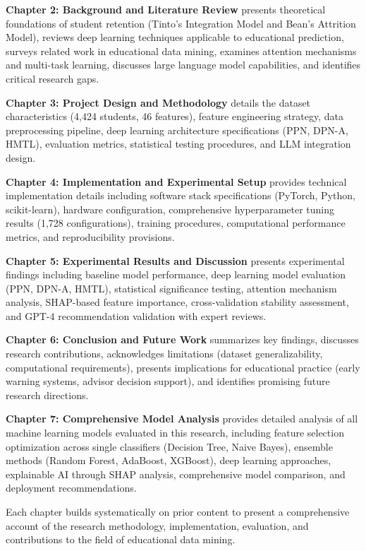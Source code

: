 \textbf{Chapter 2: Background and Literature Review} presents theoretical foundations of student retention (Tinto's Integration Model and Bean's Attrition Model), reviews deep learning techniques applicable to educational prediction, surveys related work in educational data mining, examines attention mechanisms and multi-task learning, discusses large language model capabilities, and identifies critical research gaps.

\textbf{Chapter 3: Project Design and Methodology} details the dataset characteristics (4,424 students, 46 features), feature engineering strategy, data preprocessing pipeline, deep learning architecture specifications (PPN, DPN-A, HMTL), evaluation metrics, statistical testing procedures, and LLM integration design.

\textbf{Chapter 4: Implementation and Experimental Setup} provides technical implementation details including software stack specifications (PyTorch, Python, scikit-learn), hardware configuration, comprehensive hyperparameter tuning results (1,728 configurations), training procedures, computational performance metrics, and reproducibility provisions.

\textbf{Chapter 5: Experimental Results and Discussion} presents experimental findings including baseline model performance, deep learning model evaluation (PPN, DPN-A, HMTL), statistical significance testing, attention mechanism analysis, SHAP-based feature importance, cross-validation stability assessment, and GPT-4 recommendation validation with expert reviews.

\textbf{Chapter 6: Conclusion and Future Work} summarizes key findings, discusses research contributions, acknowledges limitations (dataset generalizability, computational requirements), presents implications for educational practice (early warning systems, advisor decision support), and identifies promising future research directions.

\textbf{Chapter 7: Comprehensive Model Analysis} provides detailed analysis of all machine learning models evaluated in this research, including feature selection optimization across single classifiers (Decision Tree, Naive Bayes), ensemble methods (Random Forest, AdaBoost, XGBoost), deep learning approaches, explainable AI through SHAP analysis, comprehensive model comparison, and deployment recommendations.

Each chapter builds systematically on prior content to present a comprehensive account of the research methodology, implementation, evaluation, and contributions to the field of educational data mining.

